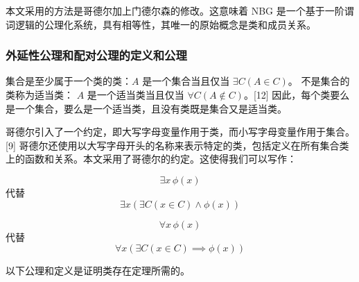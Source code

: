 本文采用的方法是哥德尔加上门德尔森的修改。这意味着 NBG 是一个基于一阶谓词逻辑的公理化系统，具有相等性，其唯一的原始概念是类和成员关系。
\subsubsection{外延性公理和配对公理的定义和公理} 
集合是至少属于一个类的类：\( A \) 是一个集合当且仅当 \( \exists C (A \in C) \)。  
不是集合的类称为适当类：  
\( A \) 是一个适当类当且仅当 \( \forall C (A \notin C) \)。[12] 因此，每个类要么是一个集合，要么是一个适当类，且没有类既是集合又是适当类。

哥德尔引入了一个约定，即大写字母变量作用于类，而小写字母变量作用于集合。[9] 哥德尔还使用以大写字母开头的名称来表示特定的类，包括定义在所有集合类上的函数和关系。本文采用了哥德尔的约定。这使得我们可以写作：

\[
\exists x \, \phi(x)
\]
代替  
\[
\exists x \left( \exists C (x \in C) \land \phi(x) \right)
\]

\[
\forall x \, \phi(x)
\]
代替  
\[
\forall x \left( \exists C (x \in C) \implies \phi(x) \right)
\]

以下公理和定义是证明类存在定理所需的。